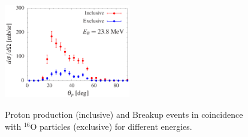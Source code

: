 \documentclass[aps,prc,onecolumn,amsmath,amssymb, preprint, 12pt]{revtex4-1}
\begin{document}
\begin{figure}[!ht]
\includegraphics[width=0.49\textwidth]{ad_120.eps}\\
 \caption{\label{proton1}  Proton production (inclusive) and Breakup events in coincidence with ${}^{16}$O particles (exclusive) for different energies. }
 \end{figure}
\end{document}

